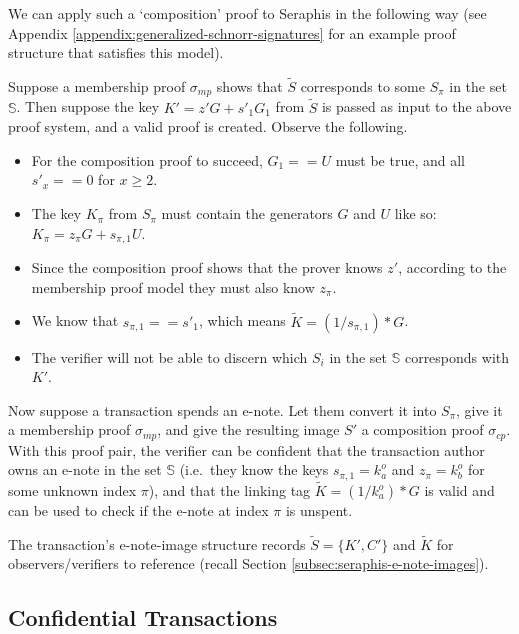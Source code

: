 We can apply such a `composition' proof to Seraphis in the following way (see Appendix \ref{appendix:generalized-schnorr-signatures} for an example proof structure that satisfies this model).

Suppose a membership proof $\sigma_{mp}$ shows that $\tilde{S}$ corresponds to some $S_{\pi}$ in the set $\mathbb{S}$. Then suppose the key $K' = z' G + s'_1 G_1$ from $\tilde{S}$ is passed as input to the above proof system, and a valid proof is created. Observe the following.

\begin{itemize}
    \item For the composition proof to succeed, $G_1 == U$ must be true, and all $s'_x == 0$ for $x \geq 2$.

    \item The key $K_{\pi}$ from $S_{\pi}$ must contain the generators $G$ and $U$ like so: $K_{\pi} = z_{\pi} G + s_{\pi, 1} U$.

    \item Since the composition proof shows that the prover knows $z'$, according to the membership proof model they must also know $z_{\pi}$.

    \item We know that $s_{\pi, 1} == s'_1$, which means $\tilde{K} = (1/ s_{\pi, 1})*G$.

    \item The verifier will not be able to discern which $S_i$ in the set $\mathbb{S}$ corresponds with $K'$.
\end{itemize}

Now suppose a transaction spends an e-note. Let them convert it into $S_{\pi}$, give it a membership proof $\sigma_{mp}$, and give the resulting image $S'$ a composition proof $\sigma_{cp}$. With this proof pair, the verifier can be confident that the transaction author owns an e-note in the set $\mathbb{S}$ (i.e.\ they know the keys $s_{\pi,1} = k^o_a$ and $z_{\pi} = k^o_b$ for some unknown index $\pi$), and that the linking tag $\tilde{K} = (1/k^o_a)*G$ is valid and can be used to check if the e-note at index $\pi$ is unspent.

The transaction's e-note-image structure records $\tilde{S} = \{K', C'\}$ and $\tilde{K}$ for observers/verifiers to reference (recall Section \ref{subsec:seraphis-e-note-images}).


\subsection{Confidential Transactions}
\label{subsec:seraphis-confidential-transactions}

